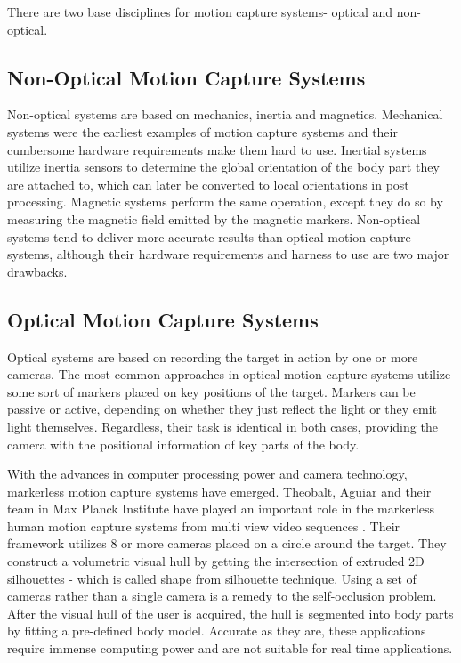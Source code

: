  There are two base disciplines for motion capture systems- optical and non-optical.
 
\subsection{Non-Optical Motion Capture Systems}
 
 Non-optical systems are based on mechanics, inertia\cite{Miller2004} and magnetics\cite{Yabukami2000}. Mechanical systems were the earliest examples of motion capture systems and 
 their cumbersome hardware requirements make them hard to use. Inertial systems utilize inertia sensors to determine the global orientation of the body part they 
 are attached to, which can later be converted to local orientations in post processing. Magnetic systems perform the same operation, except they do so by measuring 
 the magnetic field emitted by the magnetic markers. Non-optical systems tend to deliver more accurate results than optical motion capture systems, although 
 their hardware requirements and harness to use are two major drawbacks. 
 
\subsection{Optical Motion Capture Systems}

 Optical systems are based on recording the target in action by one or more 
 cameras. The most common approaches in optical motion capture systems utilize some sort of markers placed on key positions of the target. Markers can be passive
 \cite{Sementille2004} or active\cite{Maletsky2007}, depending on whether they just reflect the light or they emit light themselves. Regardless, their task is 
 identical in both cases, providing the camera with the positional information of key parts of the body. 
 
 With the advances in computer processing power and camera technology, markerless motion capture systems have emerged\cite{Cheung2003}. Theobalt, Aguiar and their team in Max 
 Planck Institute have played an important role in the markerless human motion capture systems from multi view video sequences \cite{Aguiar2007,Gall2009,Liu2011}. Their framework
 utilizes 8 or more cameras placed on a circle around the target. They construct a volumetric visual hull by getting the intersection of extruded 2D silhouettes 
 - which is called shape from silhouette technique\cite{Cheung2000,Cheung2005}. Using a set of cameras rather than a single camera is a remedy to the self-occlusion
 problem. After the visual hull of the user is acquired, the hull is segmented into body parts by fitting a pre-defined body model. Accurate as they are, these
 applications require immense computing power and are not suitable for real time applications. 
 
